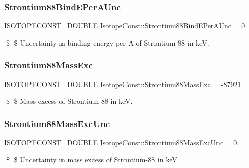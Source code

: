 \subsubsection{\texorpdfstring{Strontium88\+Bind\+E\+Per\+A\+Unc}{Strontium88BindEPerAUnc}}
{\footnotesize\ttfamily \mbox{\hyperlink{group___isotope_const-_macros_ga8f45a7272ce02c0b4c65c44636ed719a}{I\+S\+O\+T\+O\+P\+E\+C\+O\+N\+S\+T\+\_\+\+D\+O\+U\+B\+LE}} Isotope\+Const\+::\+Strontium88\+Bind\+E\+Per\+A\+Unc = 0}

\$ \$ Uncertainty in binding energy per A of Strontium-\/88 in keV. \mbox{\label{group___isotope_const-_strontium-_sr88_ga10bc6fc34c9e3c782189229f01b3daf4}} 
\subsubsection{\texorpdfstring{Strontium88\+Mass\+Exc}{Strontium88MassExc}}
{\footnotesize\ttfamily \mbox{\hyperlink{group___isotope_const-_macros_ga8f45a7272ce02c0b4c65c44636ed719a}{I\+S\+O\+T\+O\+P\+E\+C\+O\+N\+S\+T\+\_\+\+D\+O\+U\+B\+LE}} Isotope\+Const\+::\+Strontium88\+Mass\+Exc = -\/87921.}

\$ \$ Mass excess of Strontium-\/88 in keV. \mbox{\label{group___isotope_const-_strontium-_sr88_ga966fd97b0a0145a030771d83f99ea56d}} 
\subsubsection{\texorpdfstring{Strontium88\+Mass\+Exc\+Unc}{Strontium88MassExcUnc}}
{\footnotesize\ttfamily \mbox{\hyperlink{group___isotope_const-_macros_ga8f45a7272ce02c0b4c65c44636ed719a}{I\+S\+O\+T\+O\+P\+E\+C\+O\+N\+S\+T\+\_\+\+D\+O\+U\+B\+LE}} Isotope\+Const\+::\+Strontium88\+Mass\+Exc\+Unc = 0.}

\$ \$ Uncertainty in mass excess of Strontium-\/88 in keV. \mbox{\label{group___isotope_const-_strontium-_sr88_ga59f1d63908beb2ba52bab8cfbff22992}} 
